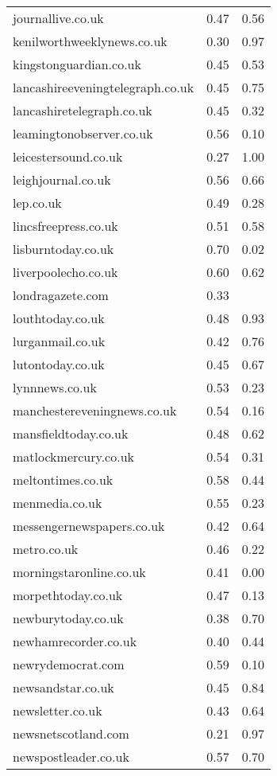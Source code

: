 \begin{longtable}{p{}p{}p{}}
  journallive.co.uk & 0.47 & 0.56 \\ 
  kenilworthweeklynews.co.uk & 0.30 & 0.97 \\ 
  kingstonguardian.co.uk & 0.45 & 0.53 \\ 
  lancashireeveningtelegraph.co.uk & 0.45 & 0.75 \\ 
  lancashiretelegraph.co.uk & 0.45 & 0.32 \\ 
  leamingtonobserver.co.uk & 0.56 & 0.10 \\ 
  leicestersound.co.uk & 0.27 & 1.00 \\ 
  leighjournal.co.uk & 0.56 & 0.66 \\ 
  lep.co.uk & 0.49 & 0.28 \\ 
  lincsfreepress.co.uk & 0.51 & 0.58 \\ 
  lisburntoday.co.uk & 0.70 & 0.02 \\ 
  liverpoolecho.co.uk & 0.60 & 0.62 \\ 
  londragazete.com & 0.33 &  \\ 
  louthtoday.co.uk & 0.48 & 0.93 \\ 
  lurganmail.co.uk & 0.42 & 0.76 \\ 
  lutontoday.co.uk & 0.45 & 0.67 \\ 
  lynnnews.co.uk & 0.53 & 0.23 \\ 
  manchestereveningnews.co.uk & 0.54 & 0.16 \\ 
  mansfieldtoday.co.uk & 0.48 & 0.62 \\ 
  matlockmercury.co.uk & 0.54 & 0.31 \\ 
  meltontimes.co.uk & 0.58 & 0.44 \\ 
  menmedia.co.uk & 0.55 & 0.23 \\ 
  messengernewspapers.co.uk & 0.42 & 0.64 \\ 
  metro.co.uk & 0.46 & 0.22 \\ 
  morningstaronline.co.uk & 0.41 & 0.00 \\ 
  morpethtoday.co.uk & 0.47 & 0.13 \\ 
  newburytoday.co.uk & 0.38 & 0.70 \\ 
  newhamrecorder.co.uk & 0.40 & 0.44 \\ 
  newrydemocrat.com & 0.59 & 0.10 \\ 
  newsandstar.co.uk & 0.45 & 0.84 \\ 
  newsletter.co.uk & 0.43 & 0.64 \\ 
  newsnetscotland.com & 0.21 & 0.97 \\ 
  newspostleader.co.uk & 0.57 & 0.70 \\ 

\end{longtable}

